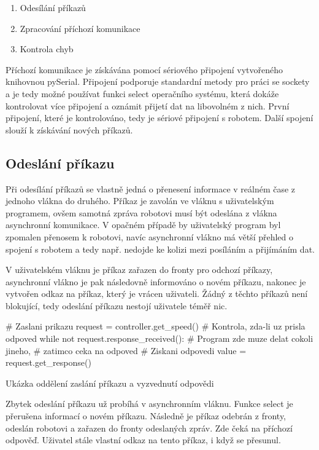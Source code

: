     \begin{enumerate}
        \item Odesílání příkazů
        \item Zpracování příchozí komunikace
        \item Kontrola chyb
    \end{enumerate}

    Příchozí komunikace je získávána pomocí sériového připojení vytvořeného
    knihovnou pySerial. Připojení podporuje standardní metody pro práci se
    sockety a je tedy možné používat funkci select operačního systému, která
    dokáže kontrolovat více připojení a oznámit přijetí dat na libovolném z
    nich. První připojení, které je kontrolováno, tedy je sériové připojení s
    robotem. Další spojení slouží k získávání nových příkazů.

    \subsection{Odeslání příkazu}

    Při odesílání příkazů se vlastně jedná o přenesení informace v reálném čase
    z jednoho vlákna do druhého. Příkaz je zavolán ve vláknu s uživatelským
    programem, ovšem samotná zpráva robotovi musí být odeslána z vlákna
    asynchronní komunikace. V opačném případě by uživatelský program byl
    zpomalen přenosem k robotovi, navíc asynchronní vlákno má větší přehled o
    spojení s robotem a tedy např. nedojde ke kolizi mezi posíláním a
    přijímáním dat.

    V uživatelském vláknu je příkaz zařazen do fronty pro odchozí příkazy,
    asynchronní vlákno je pak následovně informováno o novém příkazu, nakonec
    je vytvořen odkaz na příkaz, který je vrácen uživateli. Žádný z těchto
    příkazů není blokující, tedy odeslání příkazu nestojí uživatele téměř nic.

    \begin{listing}[H]
    \begin{pyc}
# Zaslani prikazu
request = controller.get_speed()
# Kontrola, zda-li uz prisla odpoved
while not request.response_received():
    # Program zde muze delat cokoli jineho,
    # zatimco ceka na odpoved
# Ziskani odpovedi
value = request.get_response()
    \end{pyc}
    \caption{Ukázka oddělení zaslání příkazu a vyzvednutí odpovědi}
    \end{listing}

    Zbytek odeslání příkazu už probíhá v asynchronním vláknu. Funkce select je
    přerušena informací o novém příkazu. Následně je příkaz odebrán z fronty,
    odeslán robotovi a zařazen do fronty odeslaných zpráv. Zde čeká na příchozí
    odpověď. Uživatel stále vlastní odkaz na tento příkaz, i když se přesunul.

